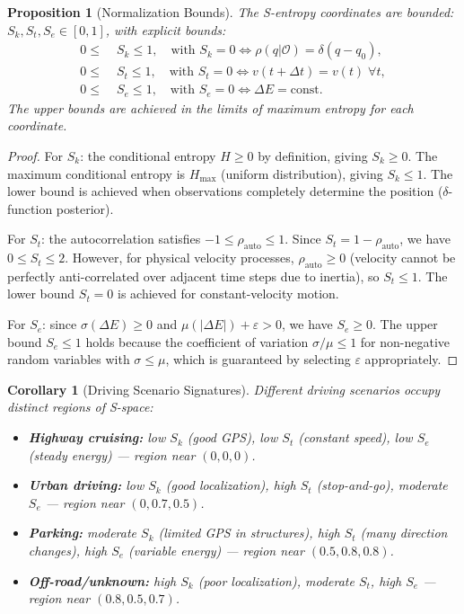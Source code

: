 \documentclass[twocolumn,10pt]{article}
\newtheorem{corollary}[theorem]{Corollary}
\newtheorem{proposition}[theorem]{Proposition}
\newcommand{\Sk}{S_k}
\newcommand{\St}{S_t}
\newcommand{\Se}{S_e}
\newcommand{\Hmax}{H_{\mathrm{max}}}
\begin{document}
\begin{proposition}[Normalization Bounds]\label{prop:normalization}
The S-entropy coordinates are bounded: $\Sk, \St, \Se \in [0,1]$, with explicit bounds:
\begin{align}
0 \leq &\;\Sk \leq 1, \quad \text{with } \Sk = 0 \Leftrightarrow \rho(q|\mathcal{O}) = \delta(q - q_0), \label{eq:Sk_bounds}\\
0 \leq &\;\St \leq 1, \quad \text{with } \St = 0 \Leftrightarrow v(t+\Delta t) = v(t)\; \forall t, \label{eq:St_bounds}\\
0 \leq &\;\Se \leq 1, \quad \text{with } \Se = 0 \Leftrightarrow \Delta E = \text{const}. \label{eq:Se_bounds}
\end{align}
The upper bounds are achieved in the limits of maximum entropy for each coordinate.
\end{proposition}

\begin{proof}
For $\Sk$: the conditional entropy $H \geq 0$ by definition, giving $\Sk \geq 0$. The maximum conditional entropy is $\Hmax$ (uniform distribution), giving $\Sk \leq 1$. The lower bound is achieved when observations completely determine the position ($\delta$-function posterior).

For $\St$: the autocorrelation satisfies $-1 \leq \rho_{\mathrm{auto}} \leq 1$. Since $\St = 1 - \rho_{\mathrm{auto}}$, we have $0 \leq \St \leq 2$. However, for physical velocity processes, $\rho_{\mathrm{auto}} \geq 0$ (velocity cannot be perfectly anti-correlated over adjacent time steps due to inertia), so $\St \leq 1$. The lower bound $\St = 0$ is achieved for constant-velocity motion.

For $\Se$: since $\sigma(\Delta E) \geq 0$ and $\mu(|\Delta E|) + \varepsilon > 0$, we have $\Se \geq 0$. The upper bound $\Se \leq 1$ holds because the coefficient of variation $\sigma/\mu \leq 1$ for non-negative random variables with $\sigma \leq \mu$, which is guaranteed by selecting $\varepsilon$ appropriately.
\end{proof}

\begin{corollary}[Driving Scenario Signatures]\label{cor:signatures}
Different driving scenarios occupy distinct regions of S-space:
\begin{itemize}
    \item \textbf{Highway cruising:} low $\Sk$ (good GPS), low $\St$ (constant speed), low $\Se$ (steady energy) --- region near $(0, 0, 0)$.
    \item \textbf{Urban driving:} low $\Sk$ (good localization), high $\St$ (stop-and-go), moderate $\Se$ --- region near $(0, 0.7, 0.5)$.
    \item \textbf{Parking:} moderate $\Sk$ (limited GPS in structures), high $\St$ (many direction changes), high $\Se$ (variable energy) --- region near $(0.5, 0.8, 0.8)$.
    \item \textbf{Off-road/unknown:} high $\Sk$ (poor localization), moderate $\St$, high $\Se$ --- region near $(0.8, 0.5, 0.7)$.
\end{itemize}
\end{corollary}
\end{document}
